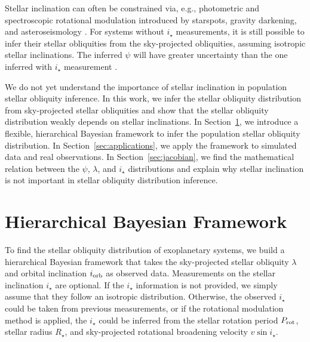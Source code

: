 \documentclass[twocolumn,times]{aastex631}
\begin{document}
Stellar inclination can often be constrained via, e.g., photometric and spectroscopic rotational modulation introduced by starspots, gravity darkening, and asteroseismology \citep[see][and references therein]{Albrecht22}.
For systems without $i_\star$ measurements, it is still possible to infer their stellar obliquities from the sky-projected obliquities, assuming isotropic stellar inclinations. The inferred $\psi$ will have greater uncertainty than the one inferred with $i_\star$ measurement \citep{Fabrycky09}.

We do not yet understand the importance of stellar inclination in population stellar obliquity inference.
In this work, we infer the stellar obliquity distribution from sky-projected stellar obliquities and show that the stellar obliquity distribution weakly depends on stellar inclinations.
In Section~\ref{sec:hbm}, we introduce a flexible, hierarchical Bayesian framework to infer the population stellar obliquity distribution.
In Section~\ref{sec:applications}, we apply the framework to simulated data and real observations.
In Section~\ref{sec:jacobian}, we find the mathematical relation between the $\psi$, $\lambda$, and $i_\star$ distributions and explain why stellar inclination is not important in stellar obliquity distribution inference.

\section{Hierarchical Bayesian Framework}\label{sec:hbm}

To find the stellar obliquity distribution of exoplanetary systems, we build a hierarchical Bayesian framework that takes the sky-projected stellar obliquity $\lambda$ and orbital inclination $i_{\rm orb}$ as observed data. Measurements on the stellar inclination $i_\star$ are optional. If the $i_\star$ information is not provided, we simply assume that they follow an isotropic distribution. Otherwise, the observed $i_\star$ could be taken from previous measurements, or if the rotational modulation method is applied, the $i_\star$ could be inferred from the stellar rotation period $P_{\rm rot}$, stellar radius $R_\star$, and sky-projected rotational broadening velocity $v\sin{i}_\star$.
\end{document}
